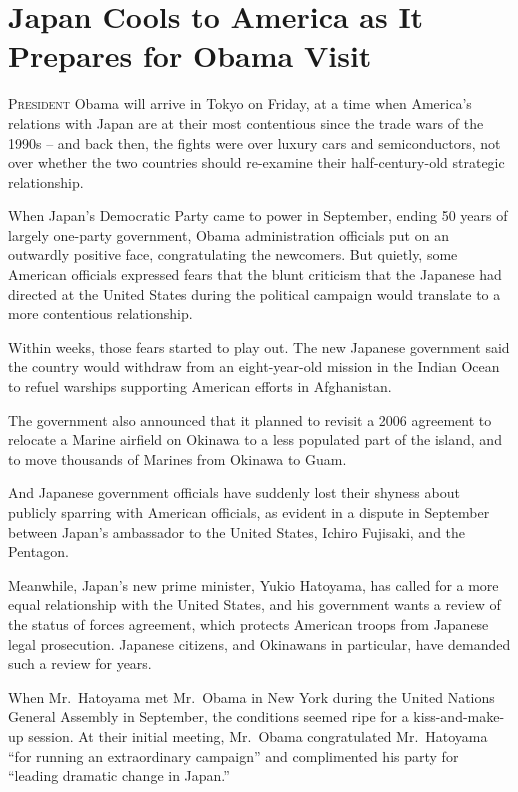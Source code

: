﻿\documentclass[12pt]{article}
\begin{document}
\section{Japan Cools to America as It Prepares for Obama Visit}

\lettrine{P}{resident} Obama will arrive in Tokyo on Friday, at a time when
America's relations with Japan are at their most contentious since the trade wars of the 1990s --
and back then, the fights were over luxury cars and semiconductors, not over whether the two
countries should re-examine their half-century-old strategic relationship.

When Japan's Democratic Party came to power in September, ending 50 years of largely one-party
government, Obama administration officials put on an outwardly positive face, congratulating the
newcomers. But quietly, some American officials expressed fears that the blunt criticism that the
Japanese had directed at the United States during the political campaign would translate to a more
contentious relationship.

Within weeks, those fears started to play out. The new Japanese government said the country would
withdraw from an eight-year-old mission in the Indian Ocean to refuel warships supporting American
efforts in Afghanistan.

The government also announced that it planned to revisit a 2006 agreement to relocate a Marine
airfield on Okinawa to a less populated part of the island, and to move thousands of Marines from
Okinawa to Guam.

And Japanese government officials have suddenly lost their shyness about publicly sparring with
American officials, as evident in a dispute in September between Japan's ambassador to the United
States, Ichiro Fujisaki, and the Pentagon.

Meanwhile, Japan's new prime minister, Yukio Hatoyama, has called for a more equal relationship with
the United States, and his government wants a review of the status of forces agreement, which
protects American troops from Japanese legal prosecution. Japanese citizens, and Okinawans in
particular, have demanded such a review for years.

When Mr.~Hatoyama met Mr.~Obama in New York during the United Nations General Assembly in September,
the conditions seemed ripe for a kiss-and-make-up session. At their initial meeting, Mr.~Obama
congratulated Mr.~Hatoyama ``for running an extraordinary campaign'' and complimented his party for
``leading dramatic change in Japan.''
\end{document}

